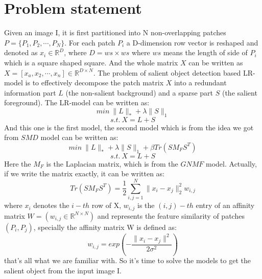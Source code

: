 \documentclass{article}
\begin{document}
\section{Problem statement }
Given an image I, it is first partitioned into N non-overlapping patches 
$P=\{P_1,P_2, \cdots ,P_N\}$. For each patch $P_i$ a D-dimension row vector is 
reshaped and denoted as $x_i \in \mathbb{R}^D$, where $D=ws \times ws$ where 
$ws$ means the length of side of $P_i$ which is a square shaped square. And the 
whole matrix $X$ can be written as $X=\left[x_a,x_2,\cdots,x_n\right]\in 
\mathbb{R}^{D \times N}$. The problem of salient object detection based 
LR-model is to effectively decompose the patch matrix $X$ into a redundant 
information part $L$ (the non-salient background) and a sparse part $S$ (the 
salient foreground). The LR-model can be written as:
$$
min \ \|L\|_{*}+ \lambda \|S\|_1 
$$
$$
s.t.\ X=L+S
$$
And this one is the first model, the second model which is from the idea we got 
from $SMD$ model can be written as:
$$
min \ \|L\|_{*}+ \lambda \|S\|_1 + \beta Tr(SM_FS^T) 
$$ 
$$
s.t.\ X=L+S
$$
Here the $M_F$ is the Laplacian matrix, which is from the $GNMF$ model. 
Actually, if we write the matrix exactly, it can be written as:
$$
Tr(SM_FS^T)=\frac{1}{2} \sum_{i,j=1}^{N}\|x_i-x_j\|^2_2w_{i,j}
$$
where $x_i$ denotes the $i-th$ row of X, $w_{i,j}$ is the $(i,j)-th$ entry of 
an affinity matrix $W=(w_{i,j}\in \mathbb{R}^{N\times N})$ and represents the 
feature similarity of patches $(P_i,P_j)$, specially the affinity matrix W is 
defined as:$$w_{i,j}=exp(-\frac{\|x_i-x_j\|^2}{2\sigma ^2})$$
that's all what we are familiar with. So it's time to solve the models to get 
the salient object from the input image I.
\end{document}
